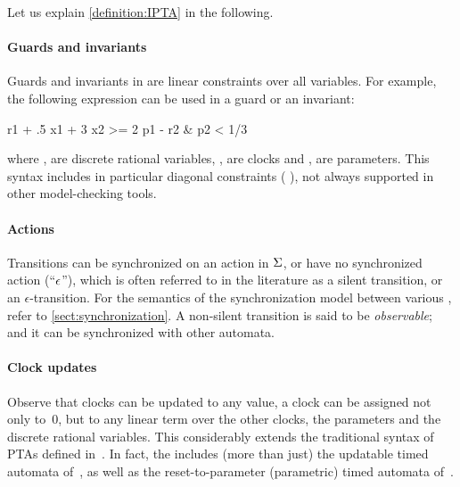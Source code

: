 Let us explain \cref{definition:IPTA} in the following.

\paragraph{Guards and invariants}
Guards and invariants in \imitator{} are linear constraints over all variables.
For example, the following expression can be used in a guard or an invariant:

\begin{IMITATORmodel}
r1 + .5 x1 + 3 x2 >= 2 p1 - r2 & p2 < 1/3
\end{IMITATORmodel}

\noindent{}where ,  are discrete rational variables, ,  are clocks and ,  are parameters.
This syntax includes in particular diagonal constraints (\eg{} ), not always supported in other model-checking tools.

\paragraph{Actions}
Transitions can be synchronized on an action in $\Sigma$, or have no synchronized action (``$\epsilon$''), which is often referred to in the literature as a silent transition, or an $\epsilon$-transition.
For the semantics of the synchronization model between various \IPTA{}, refer to \cref{sect:synchronization}.
A non-silent transition is said to be \emph{observable}; and it can be synchronized with other automata.

\paragraph{Clock updates}
Observe that clocks can be updated to any value, \ie{} a clock can be assigned not only to~0, but to any linear term over the other clocks, the parameters and the discrete rational variables.
This considerably extends the traditional syntax of PTAs defined in~\cite{AHV93}.
In fact, the \imitator{} includes (more than just) the updatable timed automata of~\cite{BDFP04}, as well as the reset-to-parameter (parametric) timed automata of~\cite{ALR18PresetTA}.

